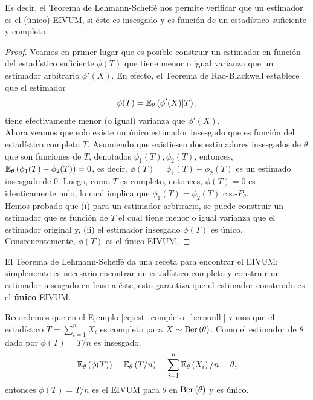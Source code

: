  Es decir, el Teorema de Lehmann-Scheffé nos permite verificar que un estimador es el (único) EIVUM, si éste es insesgado y es función de un estadístico suficiente y completo. 
    

 \begin{proof}
 	Veamos en primer lugar que es posible construir un estimador en función del estadístico suficiente $\phi(T)$ que tiene menor o igual varianza que un estimador arbitrario $\phi'(X)$. En efecto, el Teorema de Rao-Blackwell establece que el estimador 
 	\begin{equation}
 		\phi(T) = \mathbb{E}_\theta \left(\phi'(X)|T\right),
 	\end{equation}
 	tiene efectivamente menor (o igual) varianza que $\phi'(X)$.\\

 	Ahora veamos que solo existe un único estimador insesgado que es función del estadístico completo $T$. Asumiendo que existiesen dos estimadores insesgados de $\theta$ que son funciones de $T$, denotados $\phi_1(T),\phi_2(T)$, entonces, $\mathbb{E}_\theta \left(\phi_1(T)-\phi_2(T)\right)=0$, es decir, $\phi(T) = \phi_1(T)-\phi_2(T)$ es un estimado insesgado de 0. Luego, como $T$ es completo, entonces, $\phi(T)=0$ es identicamente nulo, lo cual implica que  $\phi_1(T) = \phi_2(T)$ c.s.-$P_\theta$.\\

 	Hemos probado que (i) para un estimador arbitrario, se puede construir un estimador que es función de $T$ el cual tiene menor o igual varianza que el estimador original y, (ii) el estimador insesgado $\phi(T)$ es único. Consecuentemente, $\phi(T)$ es el único EIVUM.
 \end{proof}

El Teorema de Lehmann-Scheffé da una receta para encontrar el EIVUM: simplemente es necesario encontrar un estadístico completo y construir un estimador insesgado en base a éste, esto garantiza que el estimador construido es el \textbf{único} EIVUM.
\begin{example}
	Recordemos que en el Ejemplo \ref{eq:est_completo_bernoulli} vimos que el estadístico $T=\sum_{i=1}^nX_i$ es completo para $X\sim\text{Ber}\left(\theta\right)$. Como el estimador de $\theta$ dado por $\phi(T) = T/n$ es insesgado, 
\begin{equation}
	\mathbb{E}_\theta \left(\phi(T)\right) = \mathbb{E}_\theta \left(T/n\right) = \sum_{i=1}^n \mathbb{E}_\theta \left(X_i\right) /n = \theta,
\end{equation}
entonces $\phi(T) = T/n$ es el EIVUM para $\theta$ en $\text{Ber}\left(\theta\right)$ y es único.	
\end{example}

